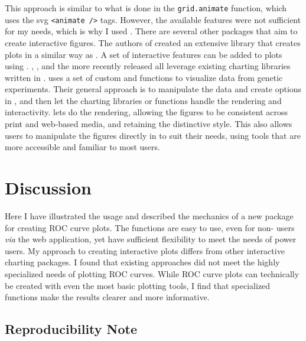 \documentclass[article]{jss}
\begin{document}
This approach is similar to what is done in the 
\texttt{grid.animate} function, which uses the svg
\texttt{\textless{}animate /\textgreater{}} tags. However, the available
features were not sufficient for my needs, which is why I used
. There are several other  packages that aim to
create interactive figures. The authors of  \citep{animint}
created an extensive  library that creates plots in
a similar way as . A set of interactive features can be
added to plots using .  \citep{ggvis},
 \citep{rcharts}, and the more recently released
 \citep{htmlwidgets} all leverage existing charting
libraries written in . 
\citep{qtlcharts} uses a set of custom  and
 functions to visualize data from genetic experiments. Their
general approach is to manipulate the data and create options in
, and then let the charting libraries or functions handle
the rendering and interactivity.  lets  do the
rendering, allowing the figures to be consistent across print and
web-based media, and retaining the distinctive  style. This
also allows users to manipulate the figures directly in  to
suit their needs, using tools that are more accessible and familiar to
most  users.

\section{Discussion}\label{discussion}

Here I have illustrated the usage and described the mechanics of a new
 package for creating ROC curve plots. The functions are
easy to use, even for non- users \emph{via} the web
application, yet have sufficient flexibility to meet the needs of power
users. My approach to creating interactive plots differs from other
interactive charting packages. I found that existing approaches did not
meet the highly specialized needs of plotting ROC curves. While ROC
curve plots can technically be created with even the most basic plotting
tools, I find that specialized functions make the results clearer and
more informative.

\subsection{Reproducibility Note}\label{reproducibility-note}
\end{document}
